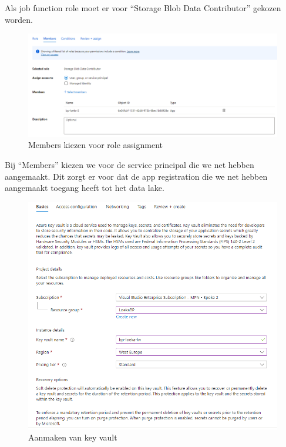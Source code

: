 Als job function role moet er voor ``Storage Blob Data Contributor'' gekozen worden.

\begin{figure}[H]
    \centering
    \includegraphics[width=1\textwidth]{./graphics/databricks/connection_6.png}
    \caption{Members kiezen voor role assignment}
\end{figure}

Bij ``Members'' kiezen we voor de service principal die we net hebben aangemaakt. Dit zorgt er voor dat de app registration die we net hebben aangemaakt toegang heeft tot het data lake.

\begin{figure}[H]
    \centering
    \includegraphics[width=1\textwidth]{./graphics/databricks/connection_8.png}
    \caption{Aanmaken van key vault}
\end{figure}

